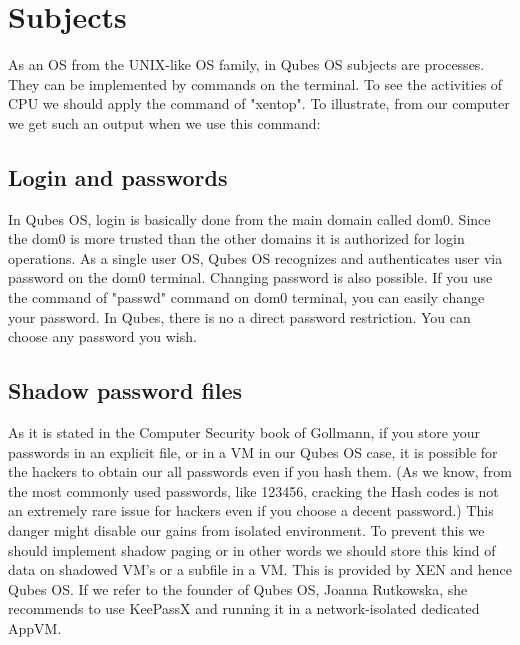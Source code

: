 \documentclass[runningheads,a4paper]{article}
\begin{document}
\section{Subjects}

As an OS from the UNIX-like OS family, in Qubes OS
subjects are processes. They can be implemented by commands on the
terminal. To see the activities of CPU we should apply the command of
"xentop". To illustrate, from our computer we get such an output when
we use this command:

\subsection{Login and passwords} 

In Qubes OS, login is basically done
from the main domain called dom0.  Since the dom0 is more trusted than
the other domains it is authorized for login operations.  As a single
user OS, Qubes OS recognizes and authenticates user via password on
the dom0 terminal.  Changing password is also possible.  If you use
the command of "passwd" command on dom0 terminal, you can easily
change your password.  In Qubes, there is no a direct password
restriction.  You can choose any password you wish.

\subsection{Shadow password files} 

As it is stated in the Computer
Security book of Gollmann, if you store your passwords in an explicit
file, or in a VM in our Qubes OS case, it is possible for the hackers
to obtain our all passwords even if you hash them.  (As we know, from
the most commonly used passwords, like 123456, cracking the Hash codes
is not an extremely rare issue for hackers even if you choose a decent
password.)  This danger might disable our gains from isolated environment.
To prevent this we should implement shadow paging or in other words we
should store this kind of data on shadowed VM's or a subfile in a VM.
This is provided by XEN and hence Qubes OS.  If we refer to the
founder of Qubes OS, Joanna Rutkowska, she recommends to use KeePassX
and running it in a network-isolated dedicated AppVM.
\end{document}
